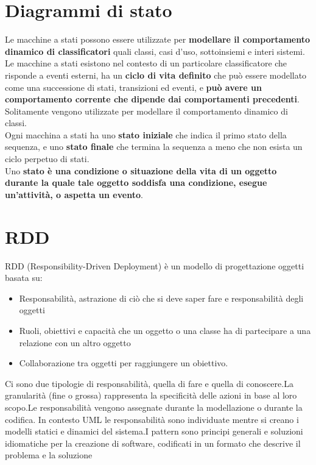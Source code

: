 \documentclass[12pt]{article}
\begin{document}
\section{Diagrammi di stato}
Le macchine a stati possono essere utilizzate per \textbf{modellare il comportamento dinamico di classificatori} quali classi, casi d’uso, sottoinsiemi e interi sistemi. \\[12pt]Le macchine a stati esistono nel contesto di un particolare classificatore che risponde a eventi esterni, ha un \textbf{ciclo di vita definito} che può essere modellato come una successione di stati, transizioni ed eventi, e \textbf{può avere un comportamento corrente che dipende dai comportamenti precedenti}. \\[12pt]Solitamente vengono utilizzate per modellare il comportamento dinamico di classi. \\[12pt]Ogni macchina a stati ha uno \textbf{stato iniziale} che indica il primo stato della sequenza, e uno \textbf{stato finale} che termina la sequenza a meno che non esista un ciclo perpetuo di stati.
\\[12pt]Uno \textbf{stato è una condizione o situazione della vita di un oggetto durante la quale tale oggetto soddisfa una condizione, esegue un’attività, o aspetta un evento}. 
\newpage
\section{RDD}
RDD (Responsibility-Driven Deployment) è un modello di progettazione oggetti basata su:
\begin{itemize}
    \item Responsabilità, astrazione di ciò che si deve saper fare e responsabilità degli oggetti
    \item Ruoli, obiettivi e capacità che un oggetto o una classe ha di partecipare a una relazione con un altro oggetto
    \item Collaborazione tra oggetti per raggiungere un obiettivo.
\end{itemize}
Ci sono due tipologie di responsabilità, quella di fare e quella di conoscere.La granularità (fine o grossa) rappresenta la specificità delle azioni in base al loro scopo.Le responsabilità vengono assegnate durante la modellazione o durante la codifica. In contesto UML le responsabilità sono individuate mentre si creano i modelli statici e dinamici del sistema.I pattern sono principi generali e soluzioni idiomatiche per la creazione di software, codificati in un formato che descrive il problema e la soluzione
\end{document}
